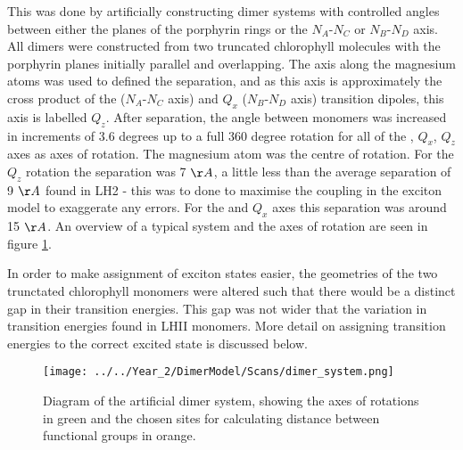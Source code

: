 This was done by artificially constructing dimer systems with controlled angles 
between either the planes of the porphyrin rings or the $N_A$-$N_C$ or $N_B$-$N_D$
axis. All dimers were constructed from two truncated chlorophyll molecules with 
the porphyrin planes initially parallel and overlapping. The axis along the magnesium
atoms was used to defined the separation, and as this axis is approximately the 
cross product of the \Qy ($N_A$-$N_C$ axis) and $Q_x$ ($N_B$-$N_D$ axis) transition
dipoles, this axis is labelled $Q_z$. After separation, the angle between monomers
was increased in increments of 3.6 degrees up to a full 360 degree rotation for 
all of the \Qy, $Q_x$, $Q_z$ axes as axes of rotation. The magnesium atom was the 
centre of rotation. For the $Q_z$ rotation the separation was 7 $\AA{}$, a little 
less than the average separation of 9 $\AA{}$ found in LH2 - this was to done to 
maximise the coupling in the exciton model to exaggerate any errors. For the \Qy
and $Q_x$ axes this separation was around 15 $\AA{}$. An overview of a typical
system and the axes of rotation are seen in figure \ref{fig:dimer_system}.

In order to make assignment of exciton states easier, the geometries of the two 
trunctated chlorophyll monomers were altered such that there would be a distinct 
gap in their transition energies. This gap was not wider that the variation in 
transition energies found in LHII monomers. More detail on assigning transition 
energies to the correct excited state is discussed below.
\begin{figure}
    \centering
    \texttt{[image: ../../Year\_2/DimerModel/Scans/dimer\_system.png]}
    \label{fig:dimer_system}
    \caption{Diagram of the artificial dimer system, showing the axes of rotations
    in green and the chosen sites for calculating distance between functional groups
    in orange.}
\end{figure}

